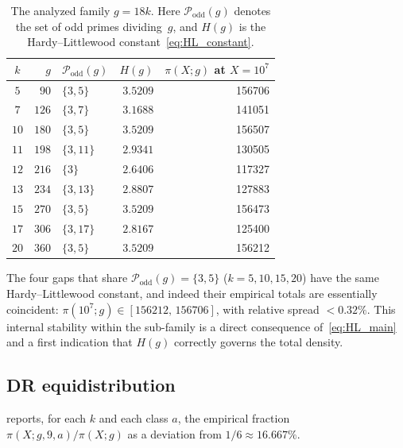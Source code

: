 \documentclass[11pt]{amsart}
\theoremstyle{plain}
\theoremstyle{definition}
\theoremstyle{remark}
\begin{document}
\begin{table}[h]
\centering
\caption{The analyzed family $g=18k$. Here
$\mathcal{P}_{\mathrm{odd}}(g)$ denotes the set of odd primes
dividing~$g$, and $H(g)$ is the Hardy--Littlewood
constant~\eqref{eq:HL_constant}.}
\label{tab:gap18k_setup}
\begin{tabular}{@{}c r l r r@{}}
\toprule
$k$ & $g$ & $\mathcal{P}_{\mathrm{odd}}(g)$ & $H(g)$ &
$\pi(X;g)$ at $X=10^7$ \\
\midrule
$5$  & $90$  & $\{3,5\}$    & $3.5209$ & \num{156706} \\
$7$  & $126$ & $\{3,7\}$    & $3.1688$ & \num{141051} \\
$10$ & $180$ & $\{3,5\}$    & $3.5209$ & \num{156507} \\
$11$ & $198$ & $\{3,11\}$   & $2.9341$ & \num{130505} \\
$12$ & $216$ & $\{3\}$      & $2.6406$ & \num{117327} \\
$13$ & $234$ & $\{3,13\}$   & $2.8807$ & \num{127883} \\
$15$ & $270$ & $\{3,5\}$    & $3.5209$ & \num{156473} \\
$17$ & $306$ & $\{3,17\}$   & $2.8167$ & \num{125400} \\
$20$ & $360$ & $\{3,5\}$    & $3.5209$ & \num{156212} \\
\bottomrule
\end{tabular}
\end{table}

The four gaps that share $\mathcal{P}_{\mathrm{odd}}(g)=\{3,5\}$
($k = 5,10,15,20$) have the same Hardy--Littlewood constant, and indeed
their empirical totals are essentially coincident:
$\pi(10^7;g) \in [\num{156212},\,\num{156706}]$, with relative spread
$< 0.32\%$. This internal stability within the sub-family is a direct
consequence of~\eqref{eq:HL_main} and a first indication that $H(g)$
correctly governs the total density.

\subsection{DR equidistribution}

 reports, for each $k$ and each class $a$, the
empirical fraction $\pi(X;g,9,a)/\pi(X;g)$ as a deviation from
$1/6 \approx 16.667\%$.
\end{document}
